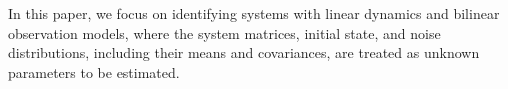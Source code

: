 %
In this paper, we focus on identifying systems with linear dynamics and bilinear observation models, where the system matrices, initial state, and noise distributions, including their means and covariances, are treated as unknown parameters to be estimated. 
